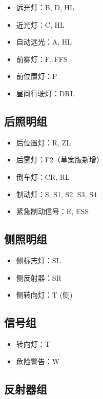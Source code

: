 \begin{itemize}[leftmargin=2em]
    \item 远光灯：B, D, HL
    \item 近光灯：C, HL
    \item 自动远光：A, HL
    \item 前雾灯：F, FFS
    \item 前位置灯：P
    \item 昼间行驶灯：DRL
\end{itemize}

\subsection{后照明组}

\begin{itemize}[leftmargin=2em]
    \item 后位置灯：R, ZL
    \item 后雾灯：F2（草案版新增）
    \item 倒车灯：CR, RL
    \item 制动灯：S, S1, S2, S3, S4
    \item 紧急制动信号：E, ESS
\end{itemize}

\subsection{侧照明组}

\begin{itemize}[leftmargin=2em]
    \item 侧标志灯：SL
    \item 侧反射器：SR
    \item 侧转向灯：T (侧)
\end{itemize}

\subsection{信号组}

\begin{itemize}[leftmargin=2em]
    \item 转向灯：T
    \item 危险警告：W
\end{itemize}

\subsection{反射器组}

